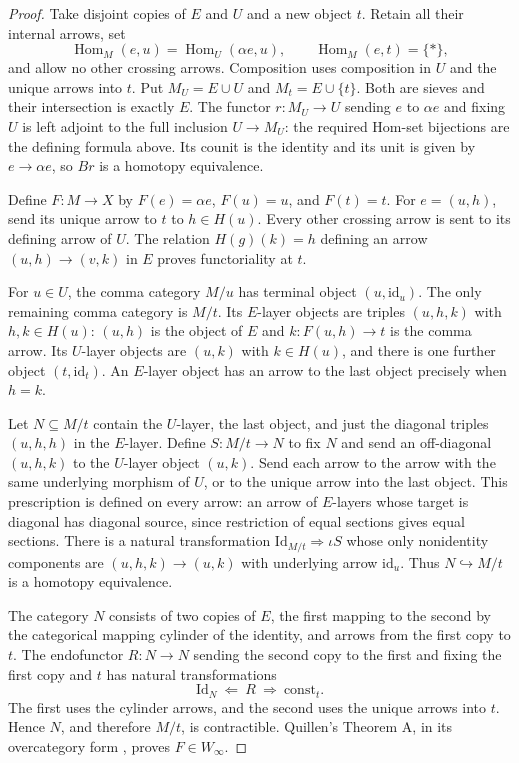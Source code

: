\begin{proof}
Take disjoint copies of $E$ and $U$ and a new object $t$. Retain all their internal arrows, set
\[
 \operatorname{Hom}_M(e,u)=\operatorname{Hom}_U(\alpha e,u),
 \qquad \operatorname{Hom}_M(e,t)=\{*\},
\]
and allow no other crossing arrows. Composition uses composition in $U$ and the unique arrows into $t$. Put $M_U=E\cup U$ and $M_t=E\cup\{t\}$. Both are sieves and their intersection is exactly $E$. The functor $r:M_U\to U$ sending $e$ to $\alpha e$ and fixing $U$ is left adjoint to the full inclusion $U\to M_U$: the required Hom-set bijections are the defining formula above. Its counit is the identity and its unit is given by $e\to\alpha e$, so $Br$ is a homotopy equivalence.

Define $F:M\to X$ by $F(e)=\alpha e$, $F(u)=u$, and $F(t)=t$. For $e=(u,h)$, send its unique arrow to $t$ to $h\in H(u)$. Every other crossing arrow is sent to its defining arrow of $U$. The relation $H(g)(k)=h$ defining an arrow $(u,h)\to(v,k)$ in $E$ proves functoriality at $t$.

For $u\in U$, the comma category $M/u$ has terminal object $(u,\mathrm{id}_u)$. The only remaining comma category is $M/t$. Its $E$-layer objects are triples $(u,h,k)$ with $h,k\in H(u)$: $(u,h)$ is the object of $E$ and $k:F(u,h)\to t$ is the comma arrow. Its $U$-layer objects are $(u,k)$ with $k\in H(u)$, and there is one further object $(t,\mathrm{id}_t)$. An $E$-layer object has an arrow to the last object precisely when $h=k$.

Let $N\subseteq M/t$ contain the $U$-layer, the last object, and just the diagonal triples $(u,h,h)$ in the $E$-layer. Define $S:M/t\to N$ to fix $N$ and send an off-diagonal $(u,h,k)$ to the $U$-layer object $(u,k)$. Send each arrow to the arrow with the same underlying morphism of $U$, or to the unique arrow into the last object. This prescription is defined on every arrow: an arrow of $E$-layers whose target is diagonal has diagonal source, since restriction of equal sections gives equal sections. There is a natural transformation $\mathrm{Id}_{M/t}\Rightarrow\iota S$ whose only nonidentity components are $(u,h,k)\to(u,k)$ with underlying arrow $\mathrm{id}_u$. Thus $N\hookrightarrow M/t$ is a homotopy equivalence.

The category $N$ consists of two copies of $E$, the first mapping to the second by the categorical mapping cylinder of the identity, and arrows from the first copy to $t$. The endofunctor $R:N\to N$ sending the second copy to the first and fixing the first copy and $t$ has natural transformations
\[
 \mathrm{Id}_N\ \Longleftarrow\ R\ \Longrightarrow\ \mathrm{const}_t.
\]
The first uses the cylinder arrows, and the second uses the unique arrows into $t$. Hence $N$, and therefore $M/t$, is contractible. Quillen's Theorem A, in its overcategory form \citep[\S1, Theorem~A]{Quillen1973}, proves $F\in W_\infty$.


\end{proof}
